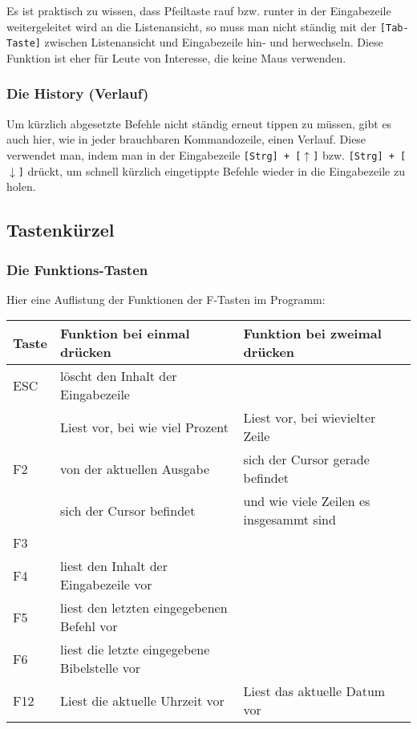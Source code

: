 \documentclass[a4paper]{scrartcl}
\begin{document}
Es ist praktisch zu wissen, dass Pfeiltaste rauf bzw. runter in der Eingabezeile weitergeleitet wird an die Listenansicht, so muss man nicht ständig mit der \texttt{[Tab-Taste]} zwischen Listenansicht und Eingabezeile hin- und herwechseln. Diese Funktion ist eher für Leute von Interesse, die keine Maus verwenden.

\subsubsection{Die History (Verlauf)}
Um kürzlich abgesetzte Befehle nicht ständig erneut tippen zu müssen, gibt es auch hier, wie in jeder brauchbaren Kommandozeile, einen Verlauf. Diese verwendet man, indem man in der Eingabezeile \texttt{[Strg] + [$\uparrow$]} bzw. \texttt{[Strg] + [$\downarrow$]} drückt, um schnell kürzlich eingetippte Befehle wieder in die Eingabezeile zu holen.

\subsection{Tastenkürzel}
\subsubsection{Die Funktions-Tasten}
Hier eine Auflistung der Funktionen der F-Tasten im Programm:\\

\begin{tabular}{|l|l|l|}
\hline
\textbf{Taste}	& \textbf{Funktion bei einmal drücken}	& \textbf{Funktion bei zweimal drücken} \\ \hline
ESC	& löscht den Inhalt der Eingabezeile		 	& \\ \hline
\multirow{3}{*}{F2}	& Liest vor, bei wie viel Prozent & Liest vor, bei wievielter Zeile \\
	& von der aktuellen Ausgabe 					& sich der Cursor gerade befindet \\
	& sich der Cursor befindet						& und wie viele Zeilen es insgesammt sind \\ \hline
F3	&	& \\ \hline
F4	& liest den Inhalt der Eingabezeile vor			& \\ \hline
F5	& liest den letzten eingegebenen Befehl vor 	& \\ \hline
F6	& liest die letzte eingegebene Bibelstelle vor	& \\ \hline
F12	& Liest die aktuelle Uhrzeit vor				& Liest das aktuelle Datum vor \\ \hline
\end{tabular}
\end{document}

